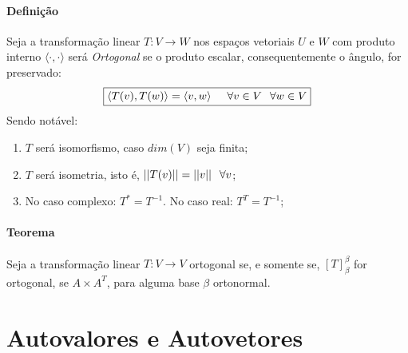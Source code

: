 \documentclass{article}
\begin{document}
            \paragraph{Definição}Seja a transformação linear $T: V \rightarrow W$ nos espaços vetoriais $U$ e $W$ com produto interno $\langle\cdot,\cdot\rangle$ será \textit{Ortogonal} se o produto escalar, consequentemente o ângulo, for preservado:
                \[\boxed{\langle T(v), T(w)\rangle = \langle v, w\rangle \hspace{5mm} \forall v\in V \hspace{2.5mm} \forall w\in V}\]
            Sendo notável:
                \begin{enumerate}[noitemsep]
                    \item $T$ será isomorfismo, caso $dim(V)$ seja finita;
                    \item $T$ será isometria, isto é, $||T(v)|| = ||v|| \hspace{2.5mm} \forall v$;
                    \item No caso complexo: $T^{*} = T^{-1}$. No caso real: $T^{T} = T^{-1}$;
                \end{enumerate}

            \paragraph{Teorema}Seja a transformação linear $T: V \rightarrow V$ ortogonal se, e somente se, $[T]_{\beta}^{\beta}$ for ortogonal, se $A\times A^{T}$, para alguma base $\beta$ ortonormal. 
\newpage

    \section{Autovalores e Autovetores}
\end{document}
